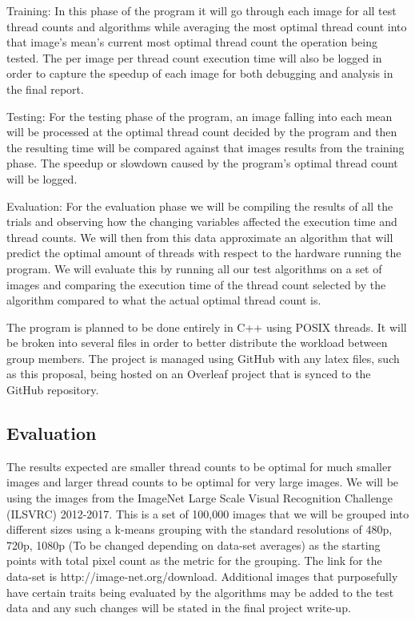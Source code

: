 \documentclass{article}
\begin{document}
\begin{multicols}{2}
                Training: In this phase of the program it will go through each image for all test thread counts and algorithms while averaging the most optimal thread count into that image's mean's current most optimal thread count the operation being tested.  The per image per thread count execution time will also be logged in order to capture the speedup of each image for both debugging and analysis in the final report.
                
                Testing: For the testing phase of the program, an image falling into each mean will be processed at the optimal thread count decided by the program and then the resulting time will be compared against that images results from the training phase.  The speedup or slowdown caused by the program's optimal thread count will be logged.  
                
                Evaluation: For the evaluation phase we will be compiling the results of all the trials and observing how the changing variables affected the execution time and thread counts.  We will then from this data approximate an algorithm that will predict the optimal amount of threads with respect to the hardware running the program.  We will evaluate this by running all our test algorithms on a set of images and comparing the execution time of the thread count selected by the algorithm compared to what the actual optimal thread count is.
                
                The program is planned to be done entirely in C++ using POSIX threads.  It will be broken into several files in order to better distribute the workload between group members.  The project is managed using GitHub with any latex files, such as this proposal, being hosted on an Overleaf project that is synced to the GitHub repository.
            
            \subsection{Evaluation}
                The results expected are smaller thread counts to be optimal for much smaller images and larger thread counts to be optimal for very large images.  We will be using the images from the  ImageNet Large Scale Visual Recognition Challenge (ILSVRC) 2012-2017.  This is a set of 100,000 images that we will be grouped into different sizes using a k-means grouping with the standard resolutions of 480p, 720p, 1080p (To be changed depending on data-set averages) as the starting points with total pixel count as the metric for the grouping.  The link for the data-set is http://image-net.org/download.  Additional images that purposefully have certain traits being evaluated by the algorithms may be added to the test data and any such changes will be stated in the final project write-up.
                

\end{multicols}
\end{document}
